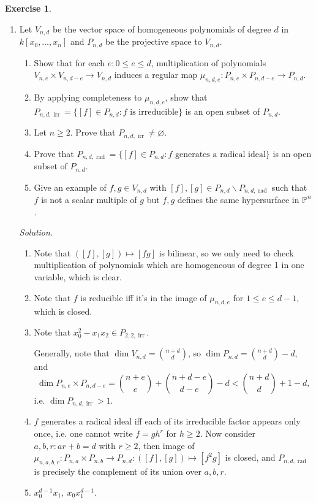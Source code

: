 \documentclass{article}
\newcommand{\p}{\mathbb{P}}
\newcommand{\irr}{\operatorname{irr}}
\newcommand{\rad}{\operatorname{rad}}
\theoremstyle{definition}
\newtheorem{exe}[defn]{Exercise}
\begin{document}
\begin{exe}
\begin{enumerate}
\item Let $V_{n,d}$ be the vector space of homogeneous polynomials of degree $d$ in $k[x_0,\ldots,x_n]$ and $P_{n,d}$ be the projective space to $V_{n,d}$.
\begin{enumerate}
\item Show that for each $e:0\leq e\leq d$, multiplication of polynomials $V_{n,e}\times V_{n,d-e}\rightarrow V_{n,d}$ induces a regular map $\mu_{n,d,e}:P_{n,e}\times P_{n,d-e}\rightarrow P_{n,d}$.
\item By applying completeness to $\mu_{n,d,e}$, show that $P_{n,d,\irr}=\{[f]\in P_{n,d}:f\text{ is irreducible}\}$ is an open subset of $P_{n,d}$.
\item Let $n\geq 2$. Prove that $P_{n,d,\irr}\neq\varnothing$.
\item Prove that $P_{n,d,\rad}=\{[f]\in P_{n,d}:f\text{ generates a radical ideal}\}$ is an open subset of $P_{n,d}$.
\item Give an example of $f,g\in V_{n,d}$ with $[f],[g]\in P_{n,d}\backslash P_{n,d,\rad}$ such that $f$ is not a scalar multiple of $g$ but $f,g$ defines the same hypersurface in $\p^n$.
\end{enumerate}

\textit{Solution.} \begin{enumerate}
\item Note that $([f],[g])\mapsto [fg]$ is bilinear, so we only need to check multiplication of polynomials which are homogeneous of degree 1 in one variable, which is clear.
\item Note that $f$ is reducible iff it's in the image of $\mu_{n,d,e}$ for $1\leq e\leq d-1$, which is closed.
\item Note that $x_0^2-x_1x_2\in P_{2,2,\irr}$.

Generally, note that $\dim V_{n,d}=\binom{n+d}{d}$, so $\dim P_{n,d}=\binom{n+d}{d}-d$, and
\[
\dim P_{n,e}\times P_{n,d-e}=\binom{n+e}{e}+\binom{n+d-e}{d-e}-d<\binom{n+d}{d}+1-d,
\]
i.e. $\dim P_{n,d,\irr}>1$.
\item $f$ generates a radical ideal iff each of its irreducible factor appears only once, i.e. one cannot write $f=gh^r$ for $h\geq 2$. Now consider $a,b,r:ar+b=d$ with $r\geq 2$, then image of $\mu_{n,a,b,r}:P_{n,a}\times P_{n,b}\rightarrow P_{n,d}:([f],[g])\mapsto [f^2g]$ is closed, and $P_{n,d,\rad}$ is precisely the complement of its union over $a,b,r$.
\item $x_0^{d-1}x_1,\ x_0x_1^{d-1}$.
\end{enumerate}


\end{enumerate}
\end{exe}
\end{document}
